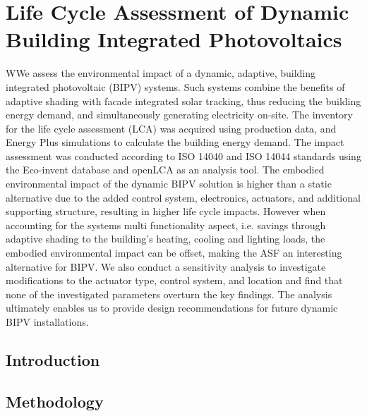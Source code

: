 
\chapter{Life Cycle Assessment of Dynamic Building Integrated Photovoltaics}
\label{ch:asfLCA}

\graphicspath{{chapters/ch4LCA/Images/}}

\begin{chapterabstract}
WWe assess the environmental impact of a dynamic, adaptive, building integrated photovoltaic (BIPV) systems. Such systems combine the benefits of adaptive shading with facade integrated solar tracking, thus reducing the building energy demand, and simultaneously generating electricity on-site. The inventory for the life cycle assessment (LCA) was acquired using production data, and Energy Plus simulations to calculate the building energy demand. The impact assessment was conducted according to ISO 14040 and ISO 14044 standards using the Eco-invent database and openLCA as an analysis tool. The embodied environmental impact of the dynamic BIPV solution is higher than a static alternative due to the added control system, electronics, actuators, and additional supporting structure, resulting in higher life cycle impacts. However when accounting for the systems multi functionality aspect, i.e. savings through adaptive shading to the building's heating, cooling and lighting loads, the embodied environmental impact can be offset, making the ASF an interesting alternative for BIPV. We also conduct a sensitivity analysis to investigate modifications to the actuator type, control system, and location and find that none of the investigated parameters overturn the key findings. The analysis ultimately enables us to provide design recommendations for future dynamic BIPV installations. 
\end{chapterabstract}


\newpage

\section{Introduction}
\label{ch:introduction4}


\section{Methodology}
\label{ch:method4}


